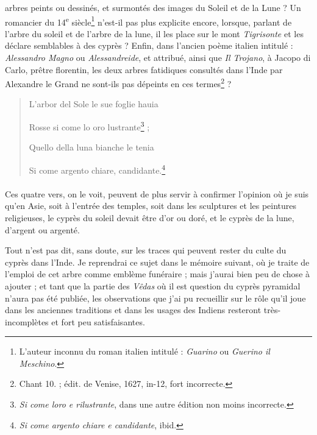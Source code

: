 \documentclass{article}
\begin{document}
arbres peints ou dessinés, et surmontés des images du Soleil et de la Lune ? Un romancier du 14\textsuperscript{e} siècle\footnote{L'auteur inconnu du roman italien intitulé : \emph{Guarino} ou \emph{Guerino il Meschino}.} n'est-il pas plus explicite encore, lorsque, parlant de l'arbre du soleil et de l'arbre de la lune, il les place sur le mont \emph{Tigrisonte} et les déclare semblables à des cyprès ? Enfin, dans l'ancien poème italien intitulé : \emph{Alessandro Magno} ou \emph{Alessandreide}, et attribué, ainsi que \emph{Il Trojano}, à Jacopo di Carlo, prêtre florentin, les deux arbres fatidiques consultés dans l'Inde par Alexandre le Grand ne sont-ils pas dépeints en ces termes\footnote{Chant 10. ; édit. de Venise, 1627, in-12, fort incorrecte.} ?

\begin{quotation}\scriptsize\bfseries

L'arbor del Sole le sue foglie hauia

Rosse si come lo oro lustrante\footnote{\emph{Si come loro e rilustrante}, dans une autre édition non moins incorrecte.} ;

Quello della luna bianche le tenia

Si come argento chiare, candidante.\footnote{\emph{Si come argento chiare e candidante}, ibid.}
\end{quotation}
\paragraph{}
Ces quatre vers, on le voit, peuvent de plus servir à confirmer l'opinion où je suis qu'en Asie, soit à l'entrée des temples, soit dans les sculptures et les peintures religieuses, le cyprès du soleil devait être d'or ou doré, et le cyprès de la lune, d'argent ou argenté.

Tout n'est pas dit, sans doute, sur les traces qui peuvent rester du culte du cyprès dans l'Inde. Je reprendrai ce sujet dans le mémoire suivant, où je traite de l'emploi de cet arbre comme emblème funéraire ; mais j'aurai bien peu de chose à ajouter ; et tant que la partie des \emph{Vêdas} où il est question du cyprès pyramidal n'aura pas été publiée, les observations que j'ai pu recueillir sur le rôle qu'il joue dans les anciennes traditions et dans les usages des Indiens resteront très-incomplètes et fort peu satisfaisantes.
\end{document}
